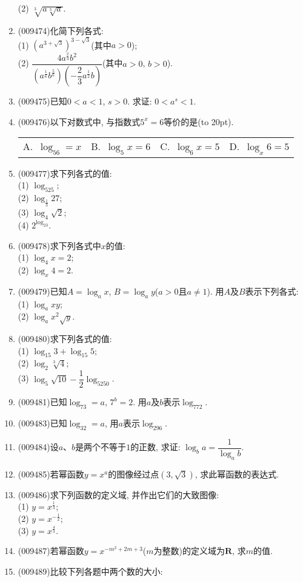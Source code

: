 \documentclass[10pt,a4paper]{article}
\newcommand{\bracket}[1]{(\hbox to #1pt{})}
\newcommand{\fourch}[4]{\par\begin{tabular}{p{.23\textwidth}p{.23\textwidth}p{.23\textwidth}p{.23\textwidth}}
A.~#1 &B.~#2& C.~#3& D.~#4
\end{tabular}}
\begin{document}
\begin{enumerate}[1.]
(2) $\sqrt[3]{a\sqrt[3]{a}}$.
\item {\tiny (009474)}化简下列各式:\\
(1) $(a^{3+\sqrt 3})^{3-\sqrt 3}$(其中$a>0$);\\
(2) $\dfrac{4a^{\frac 23}b^2}{(a^{\frac 16}b^{\frac 56})(-\dfrac 23 a^{\frac 12}b)}$(其中$a>0$, $b>0$).
\item {\tiny (009475)}已知$0<a<1$, $s>0$. 求证: $0<a^s<1$.
\item {\tiny (009476)}以下对数式中, 与指数式$5^x=6$等价的是\bracket{20}.
\fourch{$\log_56=x$}{$\log_5x=6$}{$\log_6x=5$}{$\log_x6=5$}
\item {\tiny (009477)}求下列各式的值:\\
(1) $\log_525$;\\
(2) $\log_{\frac 13}27$;\\
(3) $\log_4\sqrt 2$;\\
(4) $2^{\log_23}$.
\item {\tiny (009478)}求下列各式中$x$的值:\\
(1) $\log_4x=2$;\\
(2) $\log_x4=2$.
\item {\tiny (009479)}已知$A=\log_ax$, $B=\log_ay$($a>0$且$a\ne 1$). 用$A$及$B$表示下列各式:\\
(1) $\log_axy$;\\
(2) $\log_ax^2\sqrt y$.
\item {\tiny (009480)}求下列各式的值:\\
(1) $\log_{15}3+\log_{15}5$;\\
(2) $\log_2\sqrt[3]{4}$;\\
(3) $\log_5\sqrt{10}-\dfrac 12\log_5250$.
\item {\tiny (009481)}已知$\log_73=a$, $7^b=2$. 用$a$及$b$表示$\log_772$.
\item {\tiny (009483)}已知$\log_32=a$, 用$a$表示$\log_296$.
\item {\tiny (009484)}设$a$、$b$是两个不等于$1$的正数, 求证: $\log_ba=\dfrac1{\log_ab}$.
\item {\tiny (009485)}若幂函数$y=x^a$的图像经过点$(3, \sqrt 3)$, 求此幂函数的表达式.
\item {\tiny (009486)}求下列函数的定义域, 并作出它们的大致图像:\\
(1) $y=x^{\frac 13}$;\\
(2) $y=x^{-\frac 12}$;\\
(3) $y=x^{\frac 43}$.
\item {\tiny (009487)}若幂函数$y=x^{-m^2+2m+3}$($m$为整数)的定义域为$\mathbf{R}$, 求$m$的值.
\item {\tiny (009489)}比较下列各题中两个数的大小:\\

\end{enumerate}
\end{document}
